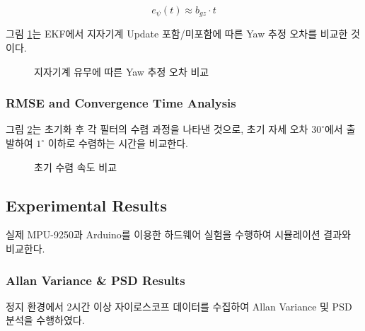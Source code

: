             \begin{equation}
                e_{\psi}(t) \approx b_{gz} \cdot t
                \label{eq:yaw_drift}
            \end{equation}
            
            그림 \ref{fig:sim_yaw}는 EKF에서 지자기계 Update 포함/미포함에 따른 Yaw 추정 오차를 비교한 것이다.\\
            
            \begin{figure}[H]
                \centering
                \caption{지자기계 유무에 따른 Yaw 추정 오차 비교}
                \label{fig:sim_yaw}
            \end{figure}

        \subsubsection{RMSE and Convergence Time Analysis}
            그림 \ref{fig:sim_convergence}는 초기화 후 각 필터의 수렴 과정을 나타낸 것으로, 초기 자세 오차 $30^\circ$에서 출발하여 $1^\circ$ 이하로 수렴하는 시간을 비교한다.\\

            \begin{figure}[H]
                \centering
                \caption{초기 수렴 속도 비교}
                \label{fig:sim_convergence}
            \end{figure}

    \subsection{Experimental Results}
        실제 MPU-9250과 Arduino를 이용한 하드웨어 실험을 수행하여 시뮬레이션 결과와 비교한다.\\

        \subsubsection{Allan Variance \& PSD Results}
            정지 환경에서 2시간 이상 자이로스코프 데이터를 수집하여 Allan Variance 및 PSD 분석을 수행하였다.\\

